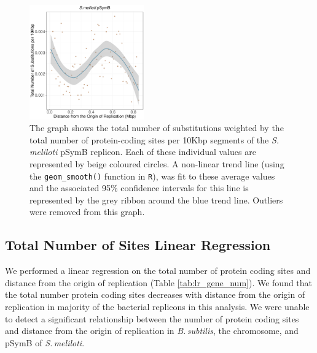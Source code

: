 \documentclass[11pt]{article}
\newcommand{\smel}{\textit{S.\,meliloti}\xspace}
\newcommand{\bass}{\textit{B.\,subtilis}\xspace}
\newcommand{\pb}{pSymB\xspace}
\providecommand{\DIFaddbegin}{} %
\providecommand{\DIFdelbegin}{} %
\providecommand{\DIFdelend}{} %
\providecommand{\DIFaddbeginFL}{} %
\providecommand{\DIFaddendFL}{} %
\providecommand{\DIFdelbeginFL}{} %
\providecommand{\DIFdelendFL}{} %
\begin{document}
\DIFdelbegin %
\DIFdelend \DIFaddbegin \begin{figure}[H]
	\DIFaddendFL \begin{center}
		\DIFdelbeginFL %
\DIFdelendFL \DIFaddbeginFL \includegraphics[width=0.44\textwidth]{./figs/pSymB_10KB_weighted_subs_nonpar_22Sep20.pdf}
		\DIFaddendFL \caption{\label{fig:pSymB_nonpar}The graph shows the total number of substitutions weighted by the total number of protein-coding sites per 10Kbp segments of the \smel \pb replicon. Each of these individual values are represented by beige coloured circles. A non-linear trend line (using the \texttt{geom\_smooth()} function in \texttt{R}), was fit to these average values and the associated 95\% confidence intervals for this line is represented by the grey ribbon around the blue trend line. Outliers were removed from this graph.}
	\end{center}
\end{figure}






\subsection{Total Number of Sites Linear Regression}

We performed a linear regression on the total number of protein coding sites and distance from the origin of replication (Table \ref{tab:lr_gene_num}).
We found that the total number protein coding sites decreases with distance from the origin of replication in majority of the bacterial replicons in this analysis.
We were unable to detect a significant relationship between the number of protein coding sites and distance from the origin of replication in \bass,  the chromosome, and \pb of \smel.
\end{document}
